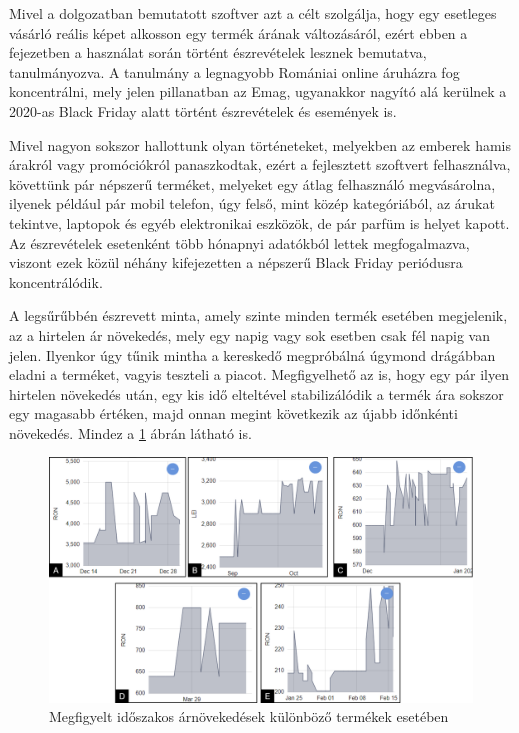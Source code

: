 Mivel a dolgozatban bemutatott szoftver azt a célt szolgálja, hogy egy esetleges vásárló reális képet alkosson egy termék árának változásáról, ezért ebben a fejezetben a használat során történt észrevételek lesznek bemutatva, tanulmányozva. A tanulmány a legnagyobb Romániai online áruházra fog koncentrálni, mely jelen pillanatban az Emag, ugyanakkor nagyító alá kerülnek a 2020-as Black Friday alatt történt észrevételek és események is. 

Mivel nagyon sokszor hallottunk olyan történeteket, melyekben az emberek hamis árakról vagy promóciókról panaszkodtak, ezért a fejlesztett szoftvert felhasználva, követtünk pár népszerű terméket, melyeket egy átlag felhasználó megvásárolna, ilyenek például pár mobil telefon, úgy felső, mint közép kategóriából, az árukat tekintve, laptopok és egyéb elektronikai eszközök, de pár parfüm is helyet kapott. Az észrevételek esetenként több hónapnyi adatókból lettek megfogalmazva, viszont ezek közül néhány kifejezetten a népszerű Black Friday periódusra koncentrálódik. 

A legsűrűbbén észrevett minta, amely szinte minden termék esetében megjelenik, az a hirtelen ár növekedés, mely egy napig vagy sok esetben csak fél napig van jelen. Ilyenkor úgy tűnik mintha a kereskedő megpróbálná úgymond drágábban eladni a terméket, vagyis teszteli a piacot. Megfigyelhető az is, hogy egy pár ilyen hirtelen növekedés után, egy kis idő elteltével stabilizálódik a termék ára sokszor egy magasabb értéken, majd onnan megint következik az újabb időnkénti növekedés. Mindez a \ref{fig:spikes} ábrán látható is.

\begin{figure}[H]
    \centering
    \includegraphics[scale=1]{figures/images/study/spikes.png}
    \caption{Megfigyelt időszakos árnövekedések különböző termékek esetében}
    \label{fig:spikes}
\end{figure}

